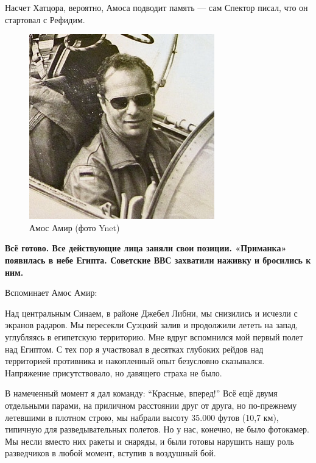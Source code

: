 Насчет Хатцора, вероятно, Амоса подводит память — сам Спектор писал, что он стартовал с Рефидим.

\begin{figure}[h!tb] 
	\centering\includegraphics[scale=0.4]{Dolina_5/EbhtRCbIZCw.jpg}
	\caption{Амос Амир (фото Ynet)}%
\end{figure}

\textbf{Всё готово. Все действующие лица заняли свои позиции. «Приманка» появилась в небе Египта. Советские ВВС захватили наживку и бросились к ним.}

Вспоминает Амос Амир:

\begin{textcitation}
	Над центральным Синаем, в районе Джебел Либни, мы снизились и исчезли с экранов радаров. Мы пересекли Суэцкий залив и продолжили лететь на запад, углубляясь в египетскую территорию. Мне вдруг вспомнился мой первый полет над Египтом. С тех пор я участвовал в десятках глубоких рейдов над территорией противника и накопленный опыт безусловно сказывался. Напряжение присутствовало, но давящего страха не было.
	
	В намеченный момент я дал команду: “Красные, вперед!” Всё ещё двумя отдельными парами, на приличном расстоянии друг от друга, но по-прежнему летевшими в плотном строю, мы набрали высоту 35.000 футов (10,7 км), типичную для разведывательных полетов. Но у нас, конечно, не было фотокамер. Мы несли вместо них ракеты и снаряды, и были готовы нарушить нашу роль разведчиков в любой момент, вступив в воздушный бой.
\end{textcitation}

